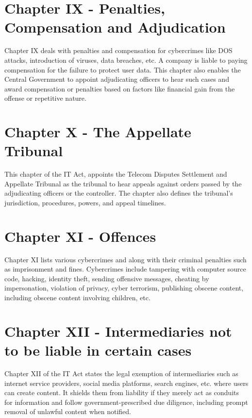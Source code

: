 \documentclass{extreport}
\begin{document}
\section*{Chapter IX - Penalties, Compensation and Adjudication}

Chapter IX deals with penalties and compensation for cybercrimes like DOS attacks, introduction of viruses, data breaches, etc. A company is liable to paying compensation for the failure to protect user data. This chapter also enables the Central Government to appoint adjudicating officers to hear such cases and award compensation or penalties based on factors like financial gain from the offense or repetitive nature.

\section*{Chapter X - The Appellate Tribunal}

This chapter of the IT Act, appoints the Telecom Disputes Settlement and Appellate Tribunal as the tribunal to hear appeals against orders passed by the adjudicating officers or the controller. The chapter also defines the tribunal's jurisdiction, procedures, powers, and appeal timelines.

\section*{Chapter XI - Offences}

\par Chapter XI lists various cybercrimes and along with their criminal penalties such as imprisonment and fines. Cybercrimes include tampering with computer source code, hacking, identity theft, sending offensive messages, cheating by impersonation, violation of privacy, cyber terrorism, publishing obscene content, including obscene content involving children, etc.

\section*{Chapter XII - Intermediaries not to be liable in certain cases}

\par Chapter XII of the IT Act states the legal exemption of intermediaries such as internet service providers, social media platforms, search engines, etc. where users can create content. It shields them from liability if they merely act as conduits for information and follow government-prescribed due diligence, including prompt removal of unlawful content when notified.
\end{document}
